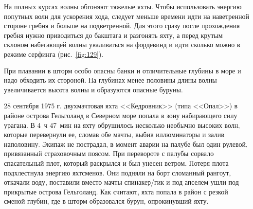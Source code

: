 \documentclass[a4paper, 12pt, twoside, final, book, russian, fittopage, cyremdash]{ncc}
\newcommand{\ris}[1]{\ref{fig:#1}}
\begin{document}
На полных курсах волны обгоняют тяжелые яхты. Чтобы использовать энергию попутных волн для ускорения хода, следует меньше времени идти на наветренной стороне гребня и больше на подветренной. Для этого сразу после прохождения гребня нужно приводиться до бакштага и разгонять яхту, а перед крутым склоном набегающей волны уваливаться на фордевинд и идти сколько можно в режиме серфинга (рис.~\ris{129}).

При плавании в шторм особо опасны банки и отличительные глубины в море и надо обходить их стороной. На глубинах менее половины длины волны увеличивается высота волны и образуются опасные буруны.

{\small 28 сентября 1975 г. двухмачтовая яхта <<Кедровник>> (типа <<Опал>>) в районе острова Гельголанд в Северном море попала в зону набирающего силу урагана. В 4~ч 47~мин на яхту обрушилось несколько необычно высоких волн, которые перевернули ее, сломав обе мачты, выбив иллюминаторы и залив наполовину. Экипаж не пострадал, в момент аварии на палубе был один рулевой, привязанный страховочным поясом. При перевороте с палубы сорвало спасательный плот, который раскрылся и был унесен ветром. Потеря плота подхлестнула энергию яхтсменов. Они подняли на борт сломанный рангоут, откачали воду, поставили вместо мачты спинакер\-/гик и под апселем ушли под прикрытые острова Гельголанд. Как считают, яхта попала в район с резкой сменой глубин, где в шторм образовался бурун, опрокинувший яхту.}
\end{document}
